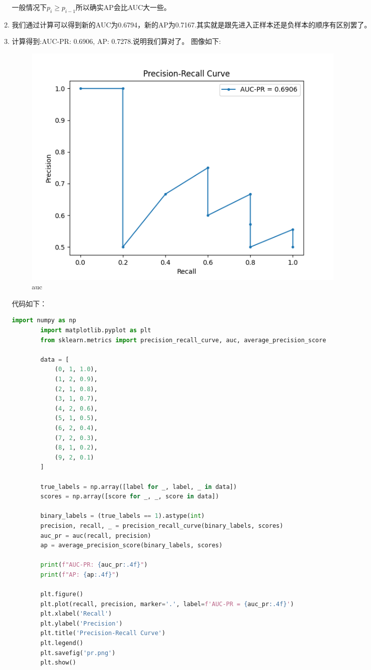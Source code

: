 \documentclass[answers]{exam}  %
\begin{document}
\begin{enumerate}[label=\alph*.]
\begin{equation*}
    \end{equation*}
    一般情况下$p_i \geq p_{i-1}$所以确实AP会比AUC大一些。
    \item 我们通过计算可以得到新的AUC为0.6794，新的AP为0.7167.其实就是跟先进入正样本还是负样本的顺序有区别罢了。
    \item 计算得到:AUC-PR: 0.6906,
    AP: 0.7278.说明我们算对了。
    图像如下:
    \begin{figure}[ht]
        \centering
        \label{auc}
        \includegraphics[width=0.8\textwidth]{pr.png} 
        \caption{auc}  
    \end{figure}
    代码如下：
    \begin{lstlisting}[language=Python, caption=Python代码示例, label=code:example, basicstyle=\ttfamily]
        import numpy as np
        import matplotlib.pyplot as plt
        from sklearn.metrics import precision_recall_curve, auc, average_precision_score

        data = [
            (0, 1, 1.0),
            (1, 2, 0.9),
            (2, 1, 0.8),
            (3, 1, 0.7),
            (4, 2, 0.6),
            (5, 1, 0.5),
            (6, 2, 0.4),
            (7, 2, 0.3),
            (8, 1, 0.2),
            (9, 2, 0.1)
        ]

        true_labels = np.array([label for _, label, _ in data])
        scores = np.array([score for _, _, score in data])

        binary_labels = (true_labels == 1).astype(int)
        precision, recall, _ = precision_recall_curve(binary_labels, scores)
        auc_pr = auc(recall, precision)
        ap = average_precision_score(binary_labels, scores)

        print(f"AUC-PR: {auc_pr:.4f}")
        print(f"AP: {ap:.4f}")

        plt.figure()
        plt.plot(recall, precision, marker='.', label=f'AUC-PR = {auc_pr:.4f}')
        plt.xlabel('Recall')
        plt.ylabel('Precision')
        plt.title('Precision-Recall Curve')
        plt.legend()
        plt.savefig('pr.png')
        plt.show()
    \end{lstlisting}
\end{enumerate}
\end{document}
